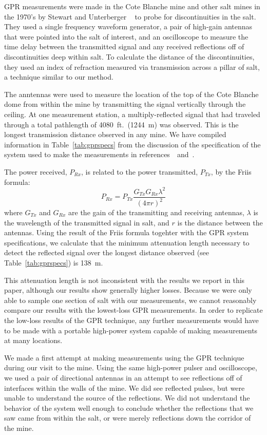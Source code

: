 \documentclass{elsart}
\begin{document}
GPR measurements were made in the Cote Blanche mine and other salt mines in the 
1970's by Stewart and Unterberger ~\cite{unterberger, s-unterberger} to probe 
for discontinuities in the salt.  They used a single frequency waveform generator, a pair of 
high-gain antennas that were pointed into the salt of interest, and an oscilloscope to measure the time delay 
between the transmitted signal and any received reflections off of discontinuities deep within salt.  
To calculate the distance of the discontinuities, they used an index of refraction measured via 
transmission across a pillar of salt, a technique similar to our method.  

The anntennas were used to measure the location of the top of the Cote Blanche dome from within 
the mine by transmitting the signal vertically through the ceiling.  At one measurement station, 
a multiply-reflected signal that had traveled through a total pathlength of 4080~ft.~(1244~m) 
was observed.  This is the longest transmission distance observed in any mine.  
We have compiled information in Table~\ref{tab:gprspecs} 
from the discussion of the specification of the system used to make the measurements in 
references~\cite{unterberger}~and~\cite{s-unterberger}.

The power received, $P_{Rx}$, is related to the power transmitted, $P_{Tx}$, by the Friis formula:
\begin{equation}
  P_{Rx}=P_{Tx}\frac{G_{Tx} G_{Rx} \lambda^2}{(4\pi r)^2}
\end{equation}
where $G_{Tx}$ and $G_{Rx}$ are the gain of the transmitting and 
receiving antennas, $\lambda$ is the wavelength of 
the transmitted signal in salt, and $r$ is the distance between 
the antennas.  Using the result of the Friis 
formula togehter with the GPR system specifications, 
we calculate that the minimum attenuation length necessary to detect the reflected signal 
over the longest distance observed (see Table~\ref{tab:gprspecs}) is 138~m.  

This attenuation length is not inconsistent with the results we report in this paper, 
although our results show generally higher losses.
Because we were only able to sample one section of salt with our measurements, we cannot reasonably 
compare our results with the lowest-loss GPR measurements.  In order to replicate the low-loss results 
of the GPR technique, any further measurements would have to be made with a portable 
high-power system capable of making measurements at many locations.  

We made a first attempt at making measurements using the GPR technique during our visit to 
the mine.  Using the same high-power pulser and oscilloscope, we used a pair of directional 
antennas in an attempt to see reflections off of interfaces within the walls of the mine.  We did 
see reflected pulses, but were unable to understand the source of the reflections.  We did not 
understand the behavior of the system well enough to conclude whether the reflections that we 
saw came from within the salt, or were merely reflections down the corridor of the mine.  
\end{document}
